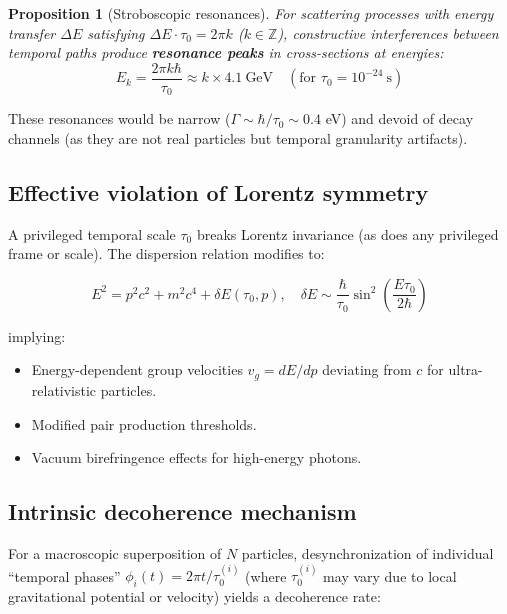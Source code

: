 \documentclass[11pt,a4paper]{article}
\newtheorem{proposition}{Proposition}
\begin{document}
\begin{proposition}[Stroboscopic resonances]
For scattering processes with energy transfer $\Delta E$ satisfying $\Delta E \cdot \tau_0 = 2\pi k$ ($k \in \mathbb{Z}$), constructive interferences between temporal paths produce \textbf{resonance peaks} in cross-sections at energies:
\begin{equation}
E_k = \frac{2\pi k \hbar}{\tau_0} \approx k \times 4.1~\text{GeV} \quad (\text{for } \tau_0 = 10^{-24}~\text{s})
\end{equation}
\end{proposition}

These resonances would be narrow ($\Gamma \sim \hbar/\tau_0 \sim 0.4$ eV) and devoid of decay channels (as they are not real particles but temporal granularity artifacts).

\subsection{Effective violation of Lorentz symmetry}

A privileged temporal scale $\tau_0$ breaks Lorentz invariance (as does any privileged frame or scale). The dispersion relation modifies to:

\begin{equation}\label{eq:modified_dispersion}
E^2 = p^2c^2 + m^2c^4 + \delta E(\tau_0, p), \quad \delta E \sim \frac{\hbar}{\tau_0} \sin^2\left(\frac{E\tau_0}{2\hbar}\right)
\end{equation}

implying:
\begin{itemize}
    \item Energy-dependent group velocities $v_g = dE/dp$ deviating from $c$ for ultra-relativistic particles.
    \item Modified pair production thresholds.
    \item Vacuum birefringence effects for high-energy photons.
\end{itemize}

\subsection{Intrinsic decoherence mechanism}

For a macroscopic superposition of $N$ particles, desynchronization of individual ``temporal phases'' $\phi_i(t) = 2\pi t/\tau_0^{(i)}$ (where $\tau_0^{(i)}$ may vary due to local gravitational potential or velocity) yields a decoherence rate:
\end{document}

